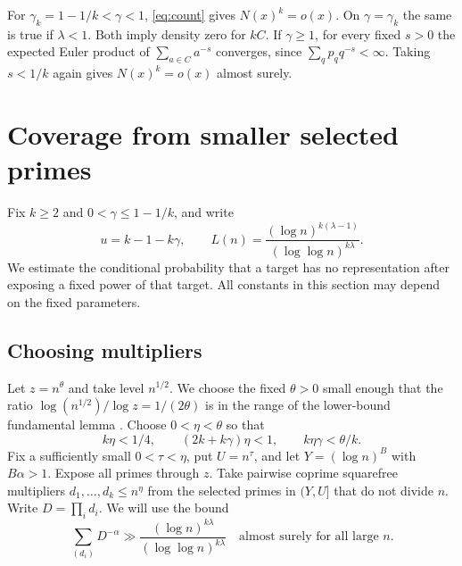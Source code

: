 \documentclass[11pt]{article}
\begin{document}
For \(\gamma_k=1-1/k<\gamma<1\), \eqref{eq:count} gives
\(N(x)^k=o(x)\). On \(\gamma=\gamma_k\) the same is true if
\(\lambda<1\). Both imply density zero for \(kC\).
If \(\gamma\ge1\), for every fixed \(s>0\) the expected Euler
product of \(\sum_{a\in C}a^{-s}\) converges, since
\(\sum_q p_q q^{-s}<\infty\). Taking \(s<1/k\) again gives
\(N(x)^k=o(x)\) almost surely.

\section{Coverage from smaller selected primes}\label{sec:coverage}

Fix \(k\ge2\) and \(0<\gamma\le1-1/k\), and write
\[
        u=k-1-k\gamma,\qquad
        L(n)=\frac{(\log n)^{k(\lambda-1)}}{(\log\log n)^{k\lambda}} .
\]
We estimate the conditional probability that a target has no
representation after exposing a fixed power of that target.
All constants in this section may depend on the fixed parameters.

\subsection{Choosing multipliers}

Let \(z=n^\theta\) and take level \(n^{1/2}\).
We choose the fixed \(\theta>0\) small enough that the ratio
\(\log(n^{1/2})/\log z=1/(2\theta)\) is in the range of the
lower-bound fundamental lemma
\cite[Theorem~3.2, specialized to \(\mathbb Q\)]{CHZ}.
Choose \(0<\eta<\theta\) so that
\[
 k\eta<1/4,\qquad (2k+k\gamma)\eta<1,\qquad k\eta\gamma<\theta/k.
\]
Fix a sufficiently small \(0<\tau<\eta\), put \(U=n^\tau\),
and let \(Y=(\log n)^B\) with \(B\alpha>1\).
Expose all primes through \(z\).
Take pairwise coprime squarefree multipliers
\(d_1,\ldots,d_k\le n^\eta\) from the selected primes in
\((Y,U]\) that do not divide \(n\). Write \(D=\prod_i d_i\).
We will use the bound
\begin{equation}\label{eq:pool}
 \sum_{(d_i)}D^{-\alpha}
          \gg \frac{(\log n)^{k\lambda}}{(\log\log n)^{k\lambda}}
                    \quad\text{almost surely for all large \(n\)}.
\end{equation}
\end{document}
